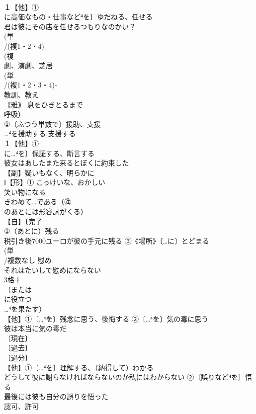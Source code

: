 \documentclass[8pt]{extreport}
\begin{document}
\begin{CJK}{UTF8}{min}
\\	１【他】①
\\	に高価なもの・仕事など⁴を〕ゆだねる、任せる 
\\	君は彼にその店を任せるつもりなのかい？
\\	(単
\\	/(複1・2・4)-
\\	(複
\\	劇、演劇、芝居 
\\	(単
\\	/(複1・2・3・4)‐
\\	教訓、教え 
\\	｟雅｠ 息をひきとるまで 
\\	呼吸）
\\	①〔ふつう単数で〕援助、支援 
\\	…⁴を援助する,支援する
\\	１【他】①
\\	に…⁴を〕保証する、断言する 
\\	彼女はあしたまた来るとぼくに約束した
\\	【副】疑いもなく、明らかに
\\	Ⅰ【形】① こっけいな、おかしい 
\\	笑い物になる
\\	きわめて…である（㊟
\\	のあとには形容詞がくる）
\\	【自】〔完了
\\	①（あとに）残る 
\\	税引き後7000ユーロが彼の手元に残る ③《場所》〔…に〕とどまる
\\	(単
\\	/複数なし 慰め 
\\	それはたいして慰めにならない
\\	3格＋
\\	（または
\\	に役立つ 
\\	…⁴を果たす）
\\	【他】①〔…⁴を〕残念に思う、後悔する ②〔…⁴を〕気の毒に思う 
\\	彼は本当に気の毒だ 
\\	〔現在〕
\\	〔過去〕
\\	〔過分〕
\\	【他】①〔…⁴を〕理解する、（納得して）わかる 
\\	どうして彼に謝らなければならないのか私にはわからない ②〔誤りなど⁴を〕悟る　
\\	最後には彼も自分の誤りを悟った 
\\	認可、許可 

\end{CJK}
\end{document}
